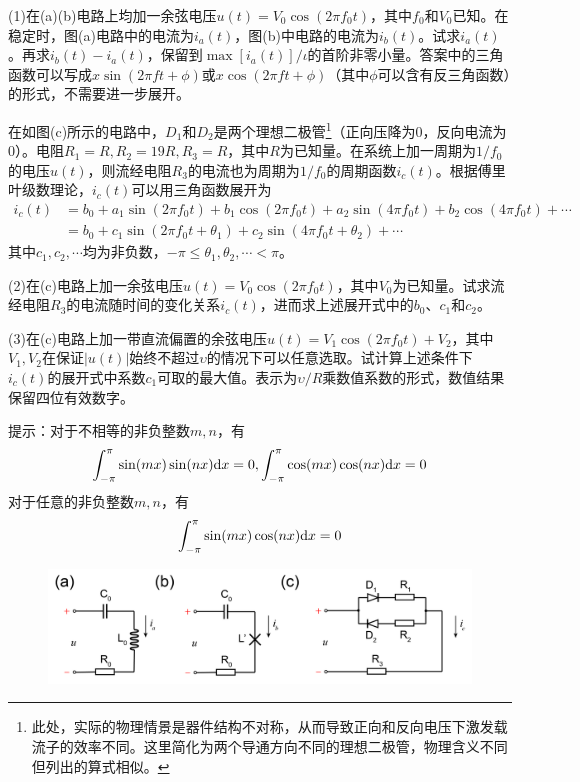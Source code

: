 \documentclass[11pt,a4paper,onecolumn,UTF8]{ctexart}
\begin{document}
	(1)在(a)(b)电路上均加一余弦电压$u(t)=V_0\cos(2\pi f_0 t)$，其中$f_0$和$V_0$已知。在稳定时，图(a)电路中的电流为$i_a(t)$，图(b)中电路的电流为$i_b(t)$。试求$i_a(t)$。再求$i_b(t)-i_a(t)$，保留到$\max[i_a(t)]/\iota$的首阶非零小量。答案中的三角函数可以写成$x\sin(2\pi ft+\phi)$或$x\cos(2\pi ft+\phi)$（其中$\phi$可以含有反三角函数）的形式，不需要进一步展开。
	
	
	在如图(c)所示的电路中，$D_1$和$D_2$是两个理想二极管\footnote{此处，实际的物理情景是器件结构不对称，从而导致正向和反向电压下激发载流子的效率不同。这里简化为两个导通方向不同的理想二极管，物理含义不同但列出的算式相似。}（正向压降为0，反向电流为0）。电阻$R_1=R,R_2=19R,R_3=R$，其中$R$为已知量。在系统上加一周期为$1/f_0$的电压$u(t)$，则流经电阻$R_3$的电流也为周期为$1/f_0$的周期函数$i_c(t)$。根据傅里叶级数理论，$i_c(t)$可以用三角函数展开为
	\begin{align*}
		i_c(t)&=b_0+a_1\sin(2\pi f_0t)+b_1\cos(2\pi f_0t)+a_2\sin(4\pi f_0t)+b_2\cos(4\pi f_0t)+\cdots\\
		&=b_0+c_1\sin(2\pi f_0t+\theta_1)+c_2\sin(4\pi f_0t+\theta_2)+\cdots
	\end{align*}
	其中$c_1,c_2,\cdots$均为非负数，$-\pi\leq\theta_1,\theta_2,\cdots<\pi$。
	
	(2)在(c)电路上加一余弦电压$u(t)=V_0\cos(2\pi f_0 t)$，其中$V_0$为已知量。试求流经电阻$R_3$的电流随时间的变化关系$i_c(t)$，进而求上述展开式中的$b_0$、$c_1$和$c_2$。
	
	(3)在(c)电路上加一带直流偏置的余弦电压$u(t)=V_1\cos(2\pi f_0t)+V_2$，其中$V_1,V_2$在保证$|u(t)|$始终不超过$\upsilon$的情况下可以任意选取。试计算上述条件下$i_c(t)$的展开式中系数$c_1$可取的最大值。表示为$\upsilon/R$乘数值系数的形式，数值结果保留四位有效数字。
	
	提示：对于不相等的非负整数$m,n$，有
	\begin{equation*}
		\int_{-\pi}^{\pi}\sin(mx)\sin(nx)\mathrm{d} x=0,
		\int_{-\pi}^{\pi}\cos(mx)\cos(nx)\mathrm{d} x=0
	\end{equation*}
	对于任意的非负整数$m,n$，有
	\begin{equation*}
		\int_{-\pi}^{\pi}\sin(mx)\cos(nx)\mathrm{d} x=0
	\end{equation*}
	
	
	\begin{figure}[!bh]
	\centering
	\includegraphics[width=0.92\columnwidth]{6.png}
	\end{figure}
	
\end{document}
